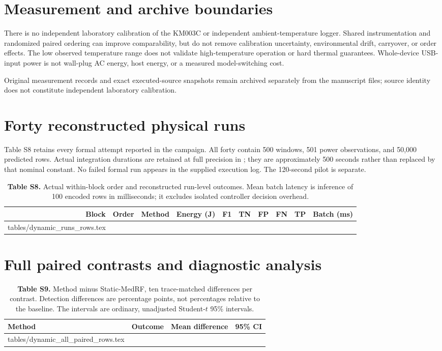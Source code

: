 \documentclass[10pt,a4paper]{article}
\makeatletter
\renewcommand{\arraystretch}{1.12}
\newcommand{\tableinput}[1]{\@@input #1.tex }
\makeatother
\begin{document}
\section{Measurement and archive boundaries}
There is no independent laboratory calibration of the KM003C or independent ambient-temperature logger. Shared instrumentation and randomized paired ordering can improve comparability, but do not remove calibration uncertainty, environmental drift, carryover, or order effects. The low observed temperature range does not validate high-temperature operation or hard thermal guarantees. Whole-device USB-input power is not wall-plug AC energy, host energy, or a measured model-switching cost.

Original measurement records and exact executed-source snapshots remain archived separately from the manuscript files; source identity does not constitute independent laboratory calibration.

\clearpage
\section{Forty reconstructed physical runs}
Table S8 retains every formal attempt reported in the campaign. All forty contain 500 windows, 501 power observations, and 50,000 predicted rows. Actual integration durations are retained at full precision in ; they are approximately 500 seconds rather than replaced by that nominal constant. No failed formal run appears in the supplied execution log. The 120-second pilot is separate.

\begin{table}[h!]
\centering\small
\caption*{\textbf{Table S8.} Actual within-block order and reconstructed run-level outcomes. Mean batch latency is inference of 100 encoded rows in milliseconds; it excludes isolated controller decision overhead.}
\setlength{\tabcolsep}{3.2pt}\renewcommand{\arraystretch}{1.06}
\begin{tabular}{rrlrrrrrrr}\toprule
Block & Order & Method & Energy (J) & F1 & TN & FP & FN & TP & Batch (ms)\\\midrule
\tableinput{tables/dynamic_runs_rows}
\bottomrule\end{tabular}
\end{table}

\clearpage
\section{Full paired contrasts and diagnostic analysis}
\begin{table}[h!]
\centering\small
\caption*{\textbf{Table S9.} Method minus Static-MedRF, ten trace-matched differences per contrast. Detection differences are percentage points, not percentages relative to the baseline. The intervals are ordinary, unadjusted Student-$t$ 95\% intervals.}
\begin{tabular}{llrr}\toprule
Method & Outcome & Mean difference & 95\% CI\\\midrule
\tableinput{tables/dynamic_all_paired_rows}
\bottomrule\end{tabular}
\end{table}
\end{document}
